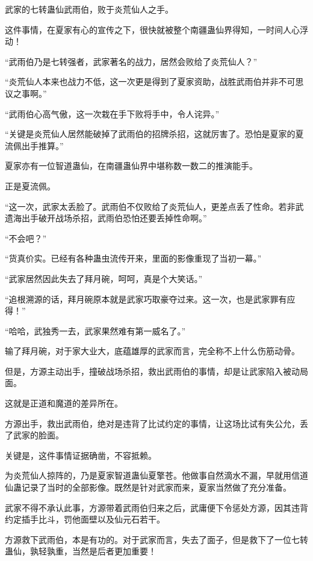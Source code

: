 
\begin{this_body}

武家的七转蛊仙武雨伯，败于炎荒仙人之手。

这件事情，在夏家有心的宣传之下，很快就被整个南疆蛊仙界得知，一时间人心浮动！

“武雨伯乃是七转强者，武家著名的战力，居然会败给了炎荒仙人？”

“炎荒仙人本来也战力不低，这一次更是得到了夏家资助，战胜武雨伯并非不可思议之事啊。”

“武雨伯心高气傲，这一次栽在手下败将手中，令人诧异。”

“关键是炎荒仙人居然能破掉了武雨伯的招牌杀招，这就厉害了。恐怕是夏家的夏流佩出手推算。”

夏家亦有一位智道蛊仙，在南疆蛊仙界中堪称数一数二的推演能手。

正是夏流佩。

“这一次，武家太丢脸了。武雨伯不仅败给了炎荒仙人，更差点丢了性命。若非武遗海出手破开战场杀招，武雨伯恐怕还要丢掉性命啊。”

“不会吧？”

“货真价实。已经有各种蛊虫流传开来，里面的影像重现了当初一幕。”

“武家居然因此失去了拜月碗，呵呵，真是个大笑话。”

“追根溯源的话，拜月碗原本就是武家巧取豪夺过来。这一次，也是武家罪有应得！”

“哈哈，武独秀一去，武家果然难有第一威名了。”

输了拜月碗，对于家大业大，底蕴雄厚的武家而言，完全称不上什么伤筋动骨。

但是，方源主动出手，撞破战场杀招，救出武雨伯的事情，却是让武家陷入被动局面。

这就是正道和魔道的差异所在。

方源出手，救出武雨伯，绝对是违背了比试约定的事情，让这场比试有失公允，丢了武家的脸面。

关键是，这件事情证据确凿，不容抵赖。

为炎荒仙人掠阵的，乃是夏家智道蛊仙夏擎苍。他做事自然滴水不漏，早就用信道仙蛊记录了当时的全部影像。既然是针对武家而来，夏家当然做了充分准备。

武家不得不承认此事，方源带着武雨伯归来之后，武庸便下令惩处方源，因其违背约定插手比斗，罚他面壁以及仙元石若干。

方源救下武雨伯，本是有功的。对于武家而言，失去了面子，但是救下了一位七转蛊仙，孰轻孰重，当然是后者更加重要！


\end{this_body}
